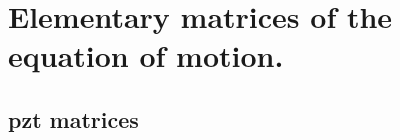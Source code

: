 
\chapter{Elementary matrices of the equation of motion.}
\label{app:matrices}

\section{\ac{pzt} matrices}


